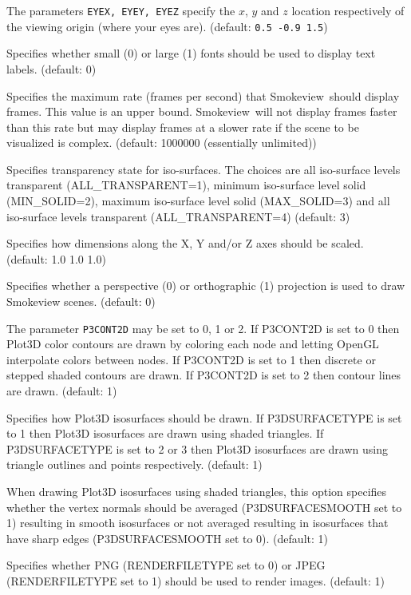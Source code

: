\documentclass[11pt,twoside]{book}
\newcommand{\Smokeview}{{Smokeview}}
\newcommand{\smokeview}{{Smokeview}}
\newcommand{\hitem}[1]{\item[{\bf #1} \hfill]}
\begin{document}
\hitem{EYEX, EYEY, EYEZ}The parameters {\tt EYEX, EYEY, EYEZ} specify the
$x$, $y$ and $z$ location respectively of the viewing origin (where your eyes are).
(default: {\tt 0.5 -0.9 1.5})

\hitem{FONTSIZE} Specifies whether small (0) or large (1)
fonts should be used to display text labels. (default: 0)

\hitem{FRAMERATEVALUE}Specifies the maximum rate (frames per second)
that \smokeview\ should display frames.
This value is an upper bound.  \Smokeview\ will not display frames faster than
this rate but may display frames at a slower rate if the scene to be visualized is
complex.
(default: 1000000 (essentially unlimited))

\hitem{ISOTRANS}Specifies transparency state for iso-surfaces. The choices
are all iso-surface levels transparent (ALL\_TRANSPARENT=1), minimum
iso-surface level solid (MIN\_SOLID=2), maximum iso-surface level solid (MAX\_SOLID=3)
and all iso-surface levels transparent (ALL\_TRANSPARENT=4) (default: 3)

\hitem{MSCALE} Specifies how dimensions along the X, Y
and/or Z axes should be scaled. (default: 1.0 1.0 1.0)

\hitem{PROJECTION} Specifies whether a perspective (0) or orthographic (1) projection
is used to draw Smokeview scenes.
(default: 0)

\hitem{P3CONT2D}The parameter {\tt P3CONT2D} may be set to 0, 1 or
2.  If P3CONT2D is set to 0 then Plot3D color contours are drawn
by coloring each node and letting OpenGL interpolate colors
between nodes.  If P3CONT2D is set to 1 then discrete or stepped
shaded contours are drawn.  If P3CONT2D is set to 2 then contour
lines are drawn. (default: 1)

\hitem{P3DSURFACETYPE}Specifies how Plot3D isosurfaces should be
drawn.  If P3DSURFACETYPE is set to 1 then Plot3D isosurfaces are
drawn using shaded triangles.  If P3DSURFACETYPE is set to 2 or 3
then Plot3D isosurfaces are drawn using triangle outlines and
points respectively. (default: 1)

\hitem{P3DSURFACESMOOTH}When drawing Plot3D isosurfaces using
shaded triangles, this option specifies whether the vertex normals
should be averaged (P3DSURFACESMOOTH set to 1) resulting in smooth
isosurfaces or not averaged resulting in isosurfaces that have
sharp edges (P3DSURFACESMOOTH set to 0). (default: 1)

\hitem{RENDERFILETYPE}Specifies whether PNG (RENDERFILETYPE set to 0) or JPEG (RENDERFILETYPE set to 1)
should be used to render images.  (default: 1)
\end{document}
